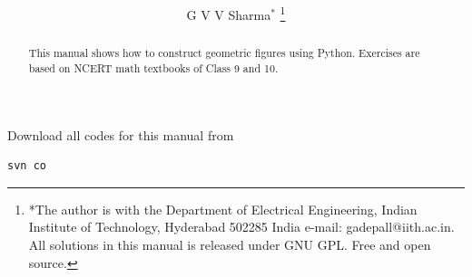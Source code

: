 \documentclass[journal,12pt,twocolumn]{IEEEtran}
\renewcommand\thesection{\arabic{section}}
\begin{document}
\let\StandardTheFigure\thefigure
\renewcommand{\thefigure}{\thesection}



\makeatletter
{}
\makeatother

\let\StandardTheFigure\thefigure
\let\StandardTheTable\thetable
\let\vec\mathbf





\def\putbox#1#2#3{\makebox[0in][l]{\makebox[#1][l]{}\raisebox{\baselineskip}[0in][0in]{\raisebox{#2}[0in][0in]{#3}}}}
     \def\rightbox#1{\makebox[0in][r]{#1}}
     \def\centbox#1{\makebox[0in]{#1}}
     \def\topbox#1{\raisebox{-\baselineskip}[0in][0in]{#1}}
     \def\midbox#1{\raisebox{-0.5\baselineskip}[0in][0in]{#1}}

\vspace{3cm}

\title{ 
}

\author{ G V V Sharma$^{*}$%
	\thanks{*The author is with the Department
		of Electrical Engineering, Indian Institute of Technology, Hyderabad
		502285 India e-mail:  gadepall@iith.ac.in. All solutions in this manual is released under GNU 
GPL.  Free and open source.}
	
}	

\maketitle

\tableofcontents

\bigskip

\renewcommand{\thefigure}{\theenumi}
\renewcommand{\thetable}{\theenumi}

\begin{abstract}
This manual shows how to construct geometric figures using Python. Exercises are based on  NCERT math textbooks of Class 9 and 10.
\end{abstract}
Download all codes for this manual from 
\begin{lstlisting}
svn co
\end{lstlisting}
\end{document}
